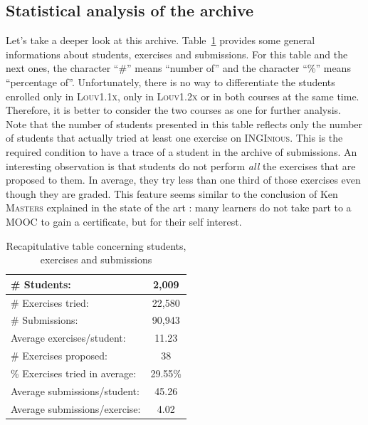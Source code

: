 \documentclass[11pt,a4paper,twoside,openright]{report}
\begin{document}
\subsection{Statistical analysis of the archive}


Let's take a deeper look at this archive. Table~\ref{fig:archive_overall} 
provides some general informations about students, exercises and submissions. 
For this table and the next ones, the character \enquote{\#} means 
\enquote{number of} and the character \enquote{\%} means \enquote{percentage 
of}. Unfortunately, there is no way to differentiate the students enrolled only 
in \textsc{Louv1.1x}, only in \textsc{Louv1.2x} or in both courses at the same 
time. Therefore, it is better to consider the two courses as one for further 
analysis. Note that the number of students presented in this table reflects 
only the number of students that actually tried at least one exercise on 
\textsc{INGInious}. This is the required condition to have a trace of 
a student in the archive of submissions. An interesting observation is that 
students do not perform \textit{all} the exercises that are proposed to them. 
In average, they try less than one third of those exercises even though they 
are graded. This feature seems similar to the conclusion of Ken \textsc{Masters} 
explained in the state of the art \cite{ken} : many learners do not take part to a MOOC to 
gain a certificate, but for their self interest.\\

\begin{table}[!ht]
    \small
  \begin{center}
    \begin{tabular}{lc}
      \toprule
      \# Students: & 2,009 \\		%
      \midrule
      \# Exercises tried: & 22,580 \\	%
      \midrule
      \# Submissions: & 90,943 \\	%
      \midrule
      \midrule
      Average exercises/student: & 11.23 \\
      \midrule
      \# Exercises proposed: & 38 \\
      \midrule
      \% Exercises tried in average: & 29.55\% \\
      \midrule
      \midrule
      Average submissions/student: & 45.26 \\
      \midrule
      Average submissions/exercise: & 4.02 \\
      \bottomrule
    \end{tabular}
  \end{center}
  \caption{Recapitulative table concerning students, exercises and submissions} 
\label{fig:archive_overall}
\end{table}
\end{document}
